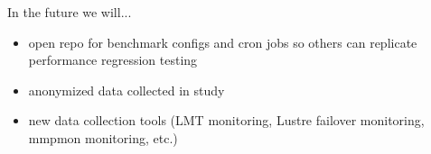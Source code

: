 In the future we will...


\begin{itemize}
\item open repo for benchmark configs and cron jobs so others can replicate
performance regression testing
\item anonymized data collected in study
\item new data collection tools (LMT monitoring, Lustre failover monitoring,
mmpmon monitoring, etc.)
\end{itemize}


